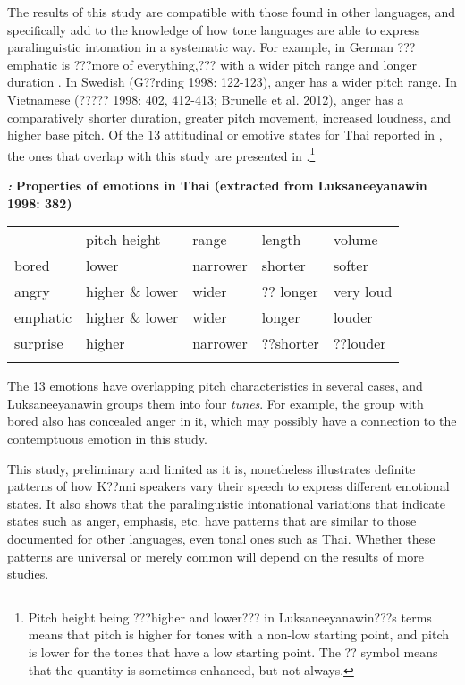 \documentclass[output=paper]{langsci/langscibook}
\begin{document}
The results of this study are compatible with those found in other languages, and specifically add to the knowledge of how tone languages are able to express paralinguistic intonation in a systematic way. For example, in German ??? emphatic is ???more of everything,??? with a wider pitch range and longer duration \citep[91]{Gibbon1998}.  In Swedish (G??rding 1998: 122-123), anger has a wider pitch range. In Vietnamese (????? 1998: 402, 412-413; Brunelle et al. 2012), anger has a comparatively shorter duration, greater pitch movement, increased loudness, and higher base pitch. Of the 13 attitudinal or emotive states for Thai reported in \citet[382]{Luksaneeyanawin1998}, the ones that overlap with this study are presented in .\footnote{ Pitch height being ???higher and lower??? in Luksaneeyanawin???s terms means that pitch is higher for tones with a non-low starting point, and pitch is lower for the tones that have a low starting point. The ?? symbol means that the quantity is sometimes enhanced, but not always.}

\emph{\textbf{\textup{:}}}\textbf{ Properties of emotions in Thai (extracted from }\textbf{Luksaneeyanawin 1998: 382)}

\begin{tabular}{lllll} & pitch height & range & length & volume\\
\lsptoprule
bored & lower & narrower & shorter & softer\\
angry & higher \& lower & wider & ?? longer & very loud\\
emphatic & higher \& lower & wider & longer & louder\\
surprise & higher & narrower & ??shorter & ??louder\\
\lspbottomrule
\end{tabular}
The 13 emotions have overlapping pitch characteristics in several cases, and Luksaneeyanawin groups them into four \emph{tunes}. For example, the group with bored also has concealed anger in it, which may possibly have a connection to the contemptuous emotion in this study.

This study, preliminary and limited as it is, nonetheless illustrates definite patterns of how K??nni speakers vary their speech to express different emotional states. It also shows that the paralinguistic intonational variations that indicate states such as anger, emphasis, etc. have patterns that are similar to those documented for other languages, even tonal ones such as Thai. Whether these patterns are universal or merely common will depend on the results of more studies.
\end{document}
